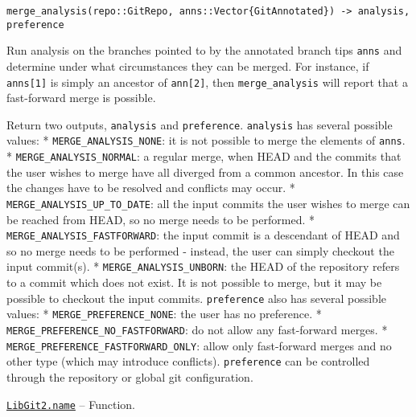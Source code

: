 \begin{adjustwidth}{2em}{0pt}


\begin{verbatim}
merge_analysis(repo::GitRepo, anns::Vector{GitAnnotated}) -> analysis, preference
\end{verbatim}

Run analysis on the branches pointed to by the annotated branch tips \texttt{anns} and determine under what circumstances they can be merged. For instance, if \texttt{anns[1]} is simply an ancestor of \texttt{ann[2]}, then \texttt{merge\_analysis} will report that a fast-forward merge is possible.

Return two outputs, \texttt{analysis} and \texttt{preference}. \texttt{analysis} has several possible values:     * \texttt{MERGE\_ANALYSIS\_NONE}: it is not possible to merge the elements of \texttt{anns}.     * \texttt{MERGE\_ANALYSIS\_NORMAL}: a regular merge, when HEAD and the commits that the       user wishes to merge have all diverged from a common ancestor. In this case the       changes have to be resolved and conflicts may occur.     * \texttt{MERGE\_ANALYSIS\_UP\_TO\_DATE}: all the input commits the user wishes to merge can       be reached from HEAD, so no merge needs to be performed.     * \texttt{MERGE\_ANALYSIS\_FASTFORWARD}: the input commit is a descendant of HEAD and so no       merge needs to be performed - instead, the user can simply checkout the       input commit(s).     * \texttt{MERGE\_ANALYSIS\_UNBORN}: the HEAD of the repository refers to a commit which does not       exist. It is not possible to merge, but it may be possible to checkout the input       commits. \texttt{preference} also has several possible values:     * \texttt{MERGE\_PREFERENCE\_NONE}: the user has no preference.     * \texttt{MERGE\_PREFERENCE\_NO\_FASTFORWARD}: do not allow any fast-forward merges.     * \texttt{MERGE\_PREFERENCE\_FASTFORWARD\_ONLY}: allow only fast-forward merges and no       other type (which may introduce conflicts). \texttt{preference} can be controlled through the repository or global git configuration.



\end{adjustwidth}
\hypertarget{2421524004789353091}{} 
\hyperlink{2421524004789353091}{\texttt{LibGit2.name}}  -- {Function.}

